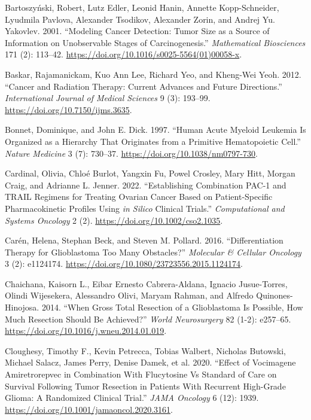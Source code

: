 \documentclass[
  letterpaper,
]{scrreprt}
\newlength{\cslhangindent}
\newenvironment{CSLReferences}[2] %
 {\begin{list}{}{%
  \setlength{\itemindent}{0pt}
  \setlength{\leftmargin}{0pt}
  \setlength{\parsep}{0pt}
  \ifodd #1
   \setlength{\leftmargin}{\cslhangindent}
   \setlength{\itemindent}{-1\cslhangindent}
  \fi
  \setlength{\itemsep}{#2\baselineskip}}}
 {\end{list}}
\theoremstyle{definition}
\theoremstyle{remark}
\begin{document}
\begin{CSLReferences}{1}{0}
Bartoszyński, Robert, Lutz Edler, Leonid Hanin, Annette Kopp-Schneider,
Lyudmila Pavlova, Alexander Tsodikov, Alexander Zorin, and Andrej Yu.
Yakovlev. 2001. {``Modeling Cancer Detection: Tumor Size as a Source of
Information on Unobservable Stages of Carcinogenesis.''}
\emph{Mathematical Biosciences} 171 (2): 113--42.
\url{https://doi.org/10.1016/s0025-5564(01)00058-x}.

Baskar, Rajamanickam, Kuo Ann Lee, Richard Yeo, and Kheng-Wei Yeoh.
2012. {``Cancer and Radiation Therapy: Current Advances and Future
Directions.''} \emph{International Journal of Medical Sciences} 9 (3):
193--99. \url{https://doi.org/10.7150/ijms.3635}.

Bonnet, Dominique, and John E. Dick. 1997. {``Human Acute Myeloid
Leukemia Is Organized as a Hierarchy That Originates from a Primitive
Hematopoietic Cell.''} \emph{Nature Medicine} 3 (7): 730--37.
\url{https://doi.org/10.1038/nm0797-730}.

Cardinal, Olivia, Chloé Burlot, Yangxin Fu, Powel Crosley, Mary Hitt,
Morgan Craig, and Adrianne L. Jenner. 2022. {``Establishing Combination
PAC{-}1 and TRAIL Regimens for Treating Ovarian Cancer Based on
Patient{-}Specific Pharmacokinetic Profiles Using {\emph{in Silico}}
Clinical Trials.''} \emph{Computational and Systems Oncology} 2 (2).
\url{https://doi.org/10.1002/cso2.1035}.

Carén, Helena, Stephan Beck, and Steven M. Pollard. 2016.
{``Differentiation Therapy for Glioblastoma {\textendash} Too Many
Obstacles?''} \emph{Molecular \& Cellular Oncology} 3 (2): e1124174.
\url{https://doi.org/10.1080/23723556.2015.1124174}.

Chaichana, Kaisorn L., Eibar Ernesto Cabrera-Aldana, Ignacio
Jusue-Torres, Olindi Wijesekera, Alessandro Olivi, Maryam Rahman, and
Alfredo Quinones-Hinojosa. 2014. {``When Gross Total Resection of a
Glioblastoma Is Possible, How Much Resection Should Be Achieved?''}
\emph{World Neurosurgery} 82 (1-2): e257--65.
\url{https://doi.org/10.1016/j.wneu.2014.01.019}.

Cloughesy, Timothy F., Kevin Petrecca, Tobias Walbert, Nicholas
Butowski, Michael Salacz, James Perry, Denise Damek, et al. 2020.
{``Effect of Vocimagene Amiretrorepvec in Combination With Flucytosine
Vs Standard of Care on Survival Following Tumor Resection in Patients
With Recurrent High-Grade Glioma: A Randomized Clinical Trial.''}
\emph{JAMA Oncology} 6 (12): 1939.
\url{https://doi.org/10.1001/jamaoncol.2020.3161}.


\end{CSLReferences}
\end{document}
